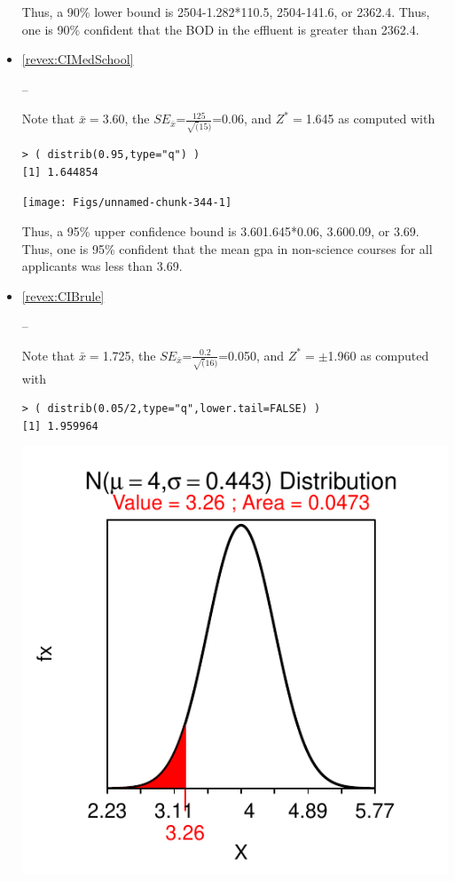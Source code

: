 \documentclass[10pt,openany]{book}\usepackage[]{graphicx}\usepackage[]{color}
\makeatletter
\newenvironment{kframe}{%
 \def\at@end@of@kframe{}%
 \ifinner\ifhmode%
  \def\at@end@of@kframe{\end{minipage}}%
  \begin{minipage}{\columnwidth}%
 \fi\fi%
 \def\FrameCommand##1{\hskip\@totalleftmargin \hskip-\fboxsep
 \colorbox{shadecolor}{##1}\hskip-\fboxsep
     \hskip-\linewidth \hskip-\@totalleftmargin \hskip\columnwidth}%
 \MakeFramed {\advance\hsize-\width
   \@totalleftmargin\z@ \linewidth\hsize
   \@setminipage}}%
 {\par\unskip\endMakeFramed%
 \at@end@of@kframe}
\newenvironment{knitrout}{}{} %
\makeatother
\begin{document}
\begin{itemize}
\begin{knitrout}
{}



\end{knitrout}
Thus, a 90\% lower bound is 2504-1.282*110.5, 2504-141.6, or 2362.4.  Thus, one is 90\% confident that the BOD in the effluent is greater than 2362.4.
  \item \hypertarget{ans:CIMedSchool}{\ref{revex:CIMedSchool}} --

Note that $\bar{x}=$3.60, the $SE_{\bar{x}}$=$\frac{125}{\sqrt(15)}$=0.06, and $Z^{*}=$1.645 as computed with
\begin{knitrout}
\color{fgcolor}\begin{kframe}
\begin{verbatim}
> ( distrib(0.95,type="q") )
[1] 1.644854
\end{verbatim}
\end{kframe}

{\centering \texttt{[image: Figs/unnamed-chunk-344-1]} 

}



\end{knitrout}
Thus, a 95\% upper confidence bound is 3.601.645*0.06, 3.600.09, or 3.69.  Thus, one is 95\% confident that the mean gpa in non-science courses for all applicants was less than 3.69.
  \item \hypertarget{ans:CIBrule}{\ref{revex:CIBrule}} --

Note that $\bar{x}=$1.725, the $SE_{\bar{x}}$=$\frac{0.2}{\sqrt(16)}$=0.050, and $Z^{*}=\pm$1.960 as computed with
\begin{knitrout}
\color{fgcolor}\begin{kframe}
\begin{verbatim}
> ( distrib(0.05/2,type="q",lower.tail=FALSE) )
[1] 1.959964
\end{verbatim}
\end{kframe}

{\centering \includegraphics[width=.4\linewidth]{Figs/unnamed-chunk-346-1} 

}
\end{knitrout}
\end{itemize}
\end{document}

